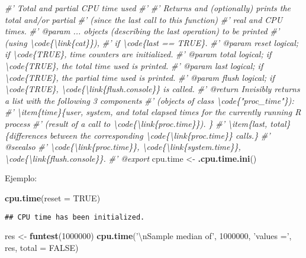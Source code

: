 \documentclass[
]{book}
\newenvironment{Shaded}{\begin{snugshade}}{\end{snugshade}}
\newcommand{\CharTok}[1]{\textcolor[rgb]{0.31,0.60,0.02}{#1}}
\newcommand{\CommentTok}[1]{\textcolor[rgb]{0.56,0.35,0.01}{\textit{#1}}}
\newcommand{\DataTypeTok}[1]{\textcolor[rgb]{0.13,0.29,0.53}{#1}}
\newcommand{\DecValTok}[1]{\textcolor[rgb]{0.00,0.00,0.81}{#1}}
\newcommand{\KeywordTok}[1]{\textcolor[rgb]{0.13,0.29,0.53}{\textbf{#1}}}
\newcommand{\NormalTok}[1]{#1}
\newcommand{\OtherTok}[1]{\textcolor[rgb]{0.56,0.35,0.01}{#1}}
\newcommand{\StringTok}[1]{\textcolor[rgb]{0.31,0.60,0.02}{#1}}
\theoremstyle{break}
\theoremstyle{definition}
\theoremstyle{definition}
\theoremstyle{definition}
\theoremstyle{remark}
\begin{document}
\begin{Shaded}
\begin{Highlighting}[]
\CommentTok{#' Total and partial CPU time used}
\CommentTok{#' }
\CommentTok{#' Returns and (optionally) prints the total and/or partial }
\CommentTok{#' (since the last call to this function) }
\CommentTok{#' real and CPU times.}
\CommentTok{#' @param ... objects (describing the last operation) to be printed  }
\CommentTok{#' (using \textbackslash{}code\{\textbackslash{}link\{cat\}\}), }
\CommentTok{#' if \textbackslash{}code\{last == TRUE\}.}
\CommentTok{#' @param reset logical; if \textbackslash{}code\{TRUE\}, time counters are initialized. }
\CommentTok{#' @param total logical; if \textbackslash{}code\{TRUE\}, the total time used is printed. }
\CommentTok{#' @param last logical; if \textbackslash{}code\{TRUE\}, the partial time used is printed. }
\CommentTok{#' @param flush logical; if \textbackslash{}code\{TRUE\}, \textbackslash{}code\{\textbackslash{}link\{flush.console\}\} is called.}
\CommentTok{#' @return Invisibly returns a list with  the following 3 components }
\CommentTok{#' (objects of class \textbackslash{}code\{"proc_time"\}):}
\CommentTok{#' \textbackslash{}item\{time\}\{user, system, and total elapsed times for the currently running R process }
\CommentTok{#' (result of a call to \textbackslash{}code\{\textbackslash{}link\{proc.time\}\}). \}}
\CommentTok{#' \textbackslash{}item\{last, total\}\{differences between the corresponding \textbackslash{}code\{\textbackslash{}link\{proc.time\}\} calls.\}}
\CommentTok{#' @seealso}
\CommentTok{#' \textbackslash{}code\{\textbackslash{}link\{proc.time\}\}, \textbackslash{}code\{\textbackslash{}link\{system.time\}\}, \textbackslash{}code\{\textbackslash{}link\{flush.console\}\}.}
\CommentTok{#' @export}
\NormalTok{cpu.time <-}\StringTok{ }\KeywordTok{.cpu.time.ini}\NormalTok{()}
\end{Highlighting}
\end{Shaded}

Ejemplo:

\begin{Shaded}
\begin{Highlighting}[]
\KeywordTok{cpu.time}\NormalTok{(}\DataTypeTok{reset =} \OtherTok{TRUE}\NormalTok{)}
\end{Highlighting}
\end{Shaded}

\begin{verbatim}
## CPU time has been initialized.
\end{verbatim}

\begin{Shaded}
\begin{Highlighting}[]
\NormalTok{res <-}\StringTok{ }\KeywordTok{funtest}\NormalTok{(}\DecValTok{1000000}\NormalTok{)}
\KeywordTok{cpu.time}\NormalTok{(}\StringTok{'}\CharTok{\textbackslash{}n}\StringTok{Sample median of'}\NormalTok{, }\DecValTok{1000000}\NormalTok{, }\StringTok{'values ='}\NormalTok{, res, }\DataTypeTok{total =} \OtherTok{FALSE}\NormalTok{)}
\end{Highlighting}
\end{Shaded}
\end{document}
